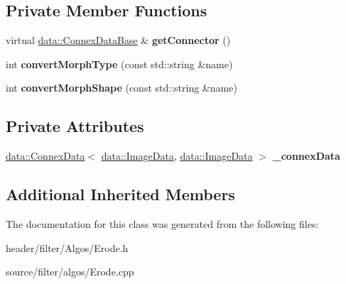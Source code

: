 \subsection*{Private Member Functions}
\begin{DoxyCompactItemize}
\item 
\mbox{\label{classfilter_1_1algos_1_1_erode_a8db17cfbba486a5fab1032cfb329fc32}} 
virtual \hyperlink{classfilter_1_1data_1_1_connex_data_base}{data\+::\+Connex\+Data\+Base} \& {\bfseries get\+Connector} ()
\item 
\mbox{\label{classfilter_1_1algos_1_1_erode_a7f18869f6bf99ea357d828358bff86c6}} 
int {\bfseries convert\+Morph\+Type} (const std\+::string \&name)
\item 
\mbox{\label{classfilter_1_1algos_1_1_erode_a85bf8b1b5da869817b3ac4107127cce9}} 
int {\bfseries convert\+Morph\+Shape} (const std\+::string \&name)
\end{DoxyCompactItemize}
\subsection*{Private Attributes}
\begin{DoxyCompactItemize}
\item 
\mbox{\label{classfilter_1_1algos_1_1_erode_af0236c7396a1d060e3bc6cc18b275920}} 
\hyperlink{classfilter_1_1data_1_1_connex_data}{data\+::\+Connex\+Data}$<$ \hyperlink{classfilter_1_1data_1_1_image_data}{data\+::\+Image\+Data}, \hyperlink{classfilter_1_1data_1_1_image_data}{data\+::\+Image\+Data} $>$ {\bfseries \+\_\+connex\+Data}
\end{DoxyCompactItemize}
\subsection*{Additional Inherited Members}


The documentation for this class was generated from the following files\+:\begin{DoxyCompactItemize}
\item 
header/filter/\+Algos/Erode.\+h\item 
source/filter/algos/Erode.\+cpp\end{DoxyCompactItemize}
